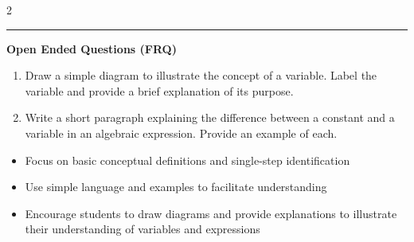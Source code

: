 \documentclass[10pt]{article}
\begin{document}
\begin{multicols}{2}
\begin{enumerate}[label=\textbf{Q\arabic*.}, leftmargin=*, itemsep=6pt, parsep=0pt]
\end{enumerate}
\end{multicols}

\vspace{-0.2cm}
\hrule
\vspace{0.2cm}
\textbf{\small Open Ended Questions (FRQ)}
\begin{enumerate}[label=\textbf{Q\arabic*.}, start=9, itemsep=5pt, topsep=0pt]

  \item \small Draw a simple diagram to illustrate the concept of a variable. Label the variable and provide a brief explanation of its purpose. \vspace{2cm}

  \item \small Write a short paragraph explaining the difference between a constant and a variable in an algebraic expression. Provide an example of each. \vspace{2cm}

\end{enumerate}

\vfill

\begin{tcolorbox}[colback=blue!5, colframe=mainblue!50, title=\small \textbf{Chef's Tips}, fonttitle=\bfseries, bottom=1mm]
\begin{itemize}[noitemsep, topsep=2pt, leftmargin=0.5cm]
  \item \scriptsize Focus on basic conceptual definitions and single-step identification\item \scriptsize Use simple language and examples to facilitate understanding\item \scriptsize Encourage students to draw diagrams and provide explanations to illustrate their understanding of variables and expressions
\end{itemize}
\end{tcolorbox}
\end{document}

